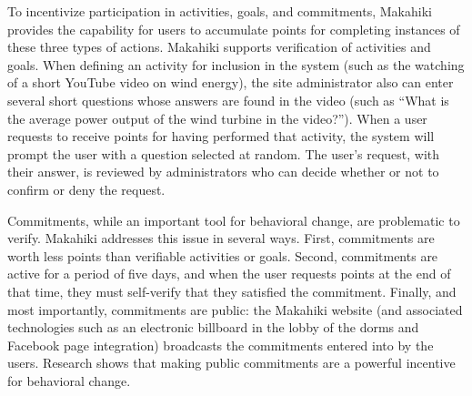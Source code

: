 To incentivize participation in activities, goals, and commitments,
Makahiki provides the capability for users to accumulate points for
completing instances of these three types of actions.  Makahiki supports
verification of activities and goals. When defining an activity for
inclusion in the system (such as the watching of a short YouTube video on
wind energy), the site administrator also can enter several short questions
whose answers are found in the video (such as ``What is the average power
output of the wind turbine in the video?'').  When a user requests to
receive points for having performed that activity, the system will prompt
the user with a question selected at random.  The user's request, with
their answer, is reviewed by administrators who can decide whether or not
to confirm or deny the request.  

Commitments, while an important tool for behavioral change, are problematic
to verify.  Makahiki addresses this issue in several ways.  First,
commitments are worth less points than verifiable activities or goals.
Second, commitments are active for a period of five days, and when the user
requests points at the end of that time, they must self-verify that they
satisfied the commitment.  Finally, and most importantly, commitments are
public: the Makahiki website (and associated technologies such as an
electronic billboard in the lobby of the dorms and Facebook page
integration) broadcasts the commitments entered into by the users. Research
shows that making public commitments are a powerful incentive for
behavioral change.





















